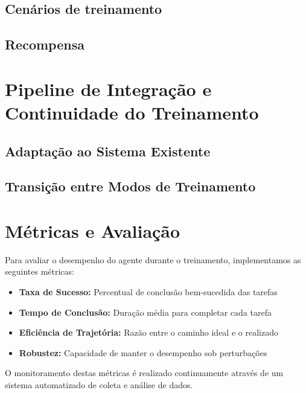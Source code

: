 \subsection{Cenários de treinamento}

\subsection{Recompensa}



\section{Pipeline de Integração e Continuidade do Treinamento}

\subsection{Adaptação ao Sistema Existente}

\subsection{Transição entre Modos de Treinamento}



\section{Métricas e Avaliação}

Para avaliar o desempenho do agente durante o treinamento, implementamos as seguintes métricas:

\begin{itemize}
    \item \textbf{Taxa de Sucesso:} Percentual de conclusão bem-sucedida das tarefas
    \item \textbf{Tempo de Conclusão:} Duração média para completar cada tarefa
    \item \textbf{Eficiência de Trajetória:} Razão entre o caminho ideal e o realizado
    \item \textbf{Robustez:} Capacidade de manter o desempenho sob perturbações
\end{itemize}

O monitoramento destas métricas é realizado continuamente através de um sistema automatizado de coleta e análise de dados.